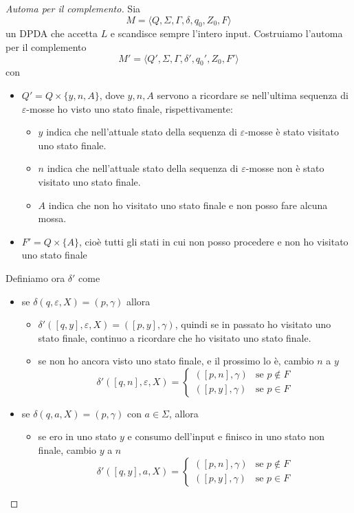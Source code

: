 \documentclass[12pt]{article}
\begin{document}
\begin{proof}[Automa per il complemento]
Sia 
$$ M = \langle Q, \Sigma, \Gamma, \delta, q_0, Z_0, F \rangle $$
un DPDA che accetta $L$ e scandisce sempre l'intero input.
Costruiamo l'automa per il complemento
$$ M' = \langle Q', \Sigma, \Gamma, \delta', q_0', Z_0, F' \rangle $$
con 
\begin{itemize}
	\item $Q' = Q \times \{y, n, A \}$, dove $y, n, A$ servono a ricordare se nell'ultima sequenza di $\varepsilon$-mosse ho visto uno stato finale, rispettivamente:
		\begin{itemize}
			\item $y$ indica che nell'attuale stato della sequenza di $\varepsilon$-mosse è stato visitato uno stato finale.
			\item $n$ indica che nell'attuale stato della sequenza di $\varepsilon$-mosse non è stato visitato uno stato finale.
			\item $A$ indica che non ho visitato uno stato finale e non posso fare alcuna mossa.
		\end{itemize}
	\item $F' = Q \times \{ A \}$, cioè tutti gli stati in cui non posso procedere e non ho visitato uno stato finale
\end{itemize}
Definiamo ora $\delta'$ come
\begin{itemize}
	\item se $\delta(q, \varepsilon, X) = (p, \gamma)$ allora 
		\begin{itemize}
			\item $\delta'([q, y], \varepsilon, X) = ([p, y], \gamma)$, quindi se in passato ho visitato uno stato finale, continuo a ricordare che ho visitato uno stato finale.
			\item se non ho ancora visto uno stato finale, e il prossimo lo è, cambio $n$ a $y$ 
				$$\delta'([q, n], \varepsilon, X) = \begin{cases} ([p, n], \gamma) & \text{se } p \not \in F \\ ([p, y], \gamma) & \text{se } p \in F \end{cases}$$
		\end{itemize}
	\item se $\delta(q, a, X) = (p, \gamma)$ con $a \in \Sigma$, allora
		\begin{itemize}
			\item se ero in uno stato $y$ e consumo dell'input e finisco in uno stato non finale, cambio $y$ a $n$
				$$\delta'([q, y], a, X) = \begin{cases} ([p, n], \gamma) & \text{se } p \not \in F \\ ([p, y], \gamma) & \text{se } p \in F \end{cases}$$

\end{itemize}
\end{itemize}
\end{proof}
\end{document}
